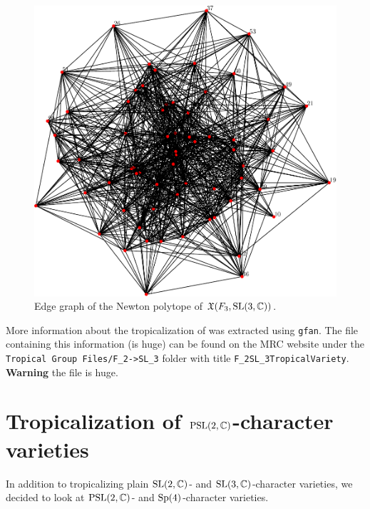 \documentclass[11pt]{article}
\begin{document}
\begin{figure}[htpb]
  \centering
  \includegraphics[scale=.55]{biggraph}
  \caption{Edge graph of the Newton polytope of
    $\mathfrak{X}(F_3,\mathrm{SL}(3,\mathbb{C}))$.}
\label{fig:f3-sl3c}
\end{figure}

More information about the tropicalization of was extracted using
\texttt{gfan}. The file containing this information (is huge) can be found
on the MRC website under the \texttt{Tropical Group Files/F\_2->SL\_3}
folder with title \texttt{F\_2SL\_3TropicalVariety}. \textbf{Warning} the
file is huge.

\section{Tropicalization of $\mathrm{PSL}(2,\mathbb{C})$-character varieties}
In addition to tropicalizing plain $\mathrm{SL}(2,\mathbb{C})$- and
$\mathrm{SL}(3,\mathbb{C})$-character varieties, we decided to look at $\mathrm{PSL}(2,\mathbb{C})$-
and $\mathrm{Sp}(4)$-character varieties.
\end{document}
